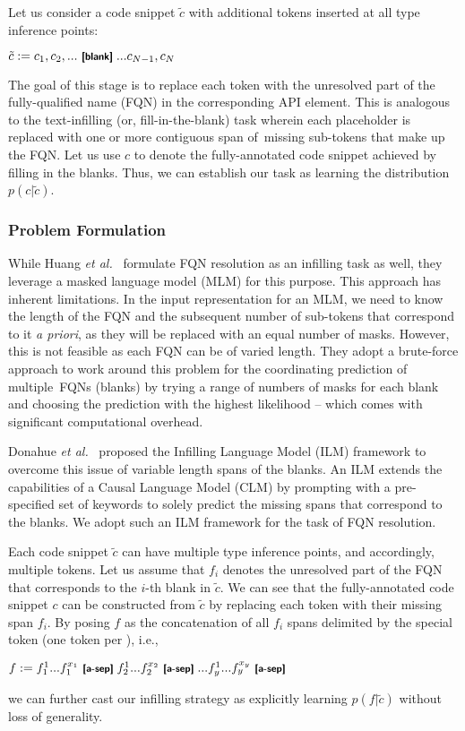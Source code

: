 Let us consider a code snippet $\tilde{c}$ with additional \blank tokens inserted at all type inference points:
\begin{center}
$\tilde{c}:= c_1, c_2, ...\text{ \blank}... c_{N-1}, c_N$
\end{center}
The goal of this stage is to replace each \blank token with the unresolved part of the fully-qualified name (FQN) in the corresponding API element. This is analogous to the text-infilling (or, fill-in-the-blank) task wherein each placeholder \blank is replaced with one or more contiguous span of~missing sub-tokens that make up the FQN. Let us use $c$ to denote the fully-annotated code snippet achieved by filling in the blanks. Thus, we can establish our task as learning the distribution~$p(c|\tilde{c})$.

\subsubsection{Problem Formulation}
\label{sec:ilm-form}
While Huang {\em et al.}~\cite{prompt-ase22} formulate FQN resolution as an infilling task as well, they leverage a masked language model (MLM) for 
this purpose.
This approach has inherent limitations. In the input representation for an MLM, we need to know the length of the FQN and the subsequent number of sub-tokens that correspond to it \textit{a priori}, as they will be replaced with an equal number of masks. However, this is not feasible as each FQN can be of varied length. They adopt a brute-force approach to work around this problem
for the coordinating prediction of multiple~FQNs (blanks)
%
by trying a range of numbers of masks for each blank and choosing the prediction with the highest likelihood -- which comes with significant computational overhead.

Donahue {\em et al.}~\cite{donahue-etal-2020-enabling} proposed the Infilling Language Model (ILM) framework to overcome this issue of variable length spans of the blanks. An ILM extends the capabilities of a Causal Language Model (CLM) by prompting with a pre-specified set of keywords to solely predict the missing spans that correspond to the blanks. We adopt such an ILM framework for the task of FQN resolution.

Each code snippet $\tilde{c}$ can have multiple type inference points, and accordingly, multiple \blank tokens. Let us assume that $f_i$ denotes the unresolved part of the FQN that corresponds to the $i$-th blank in $\tilde{c}$. We can see that the fully-annotated code snippet $c$ can be constructed from $\tilde{c}$ by replacing each \blank token with their missing span $f_i$. By posing $f$ as the concatenation of all $f_i$ spans delimited by the special \answer token (one \answer token per \blank), i.e.,
\begin{center}
    $f:= f_1^{1} ... f_1^{x_1} \text{ \answer } f_2^{1} ... f_2^{x_2} \text{ \answer } ... f_y^{1} ... f_y^{x_y} \text{ \answer}$
\end{center}
we can further cast our infilling strategy as explicitly learning $p(f|\tilde{c})$  without loss of generality.

